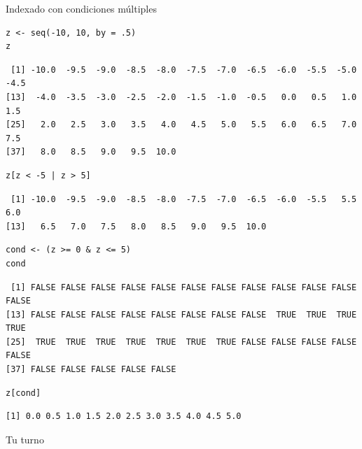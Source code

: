 \documentclass[xcolor={usenames,svgnames,dvipsnames}]{beamer}
\begin{document}
\begin{frame}[fragile,label=sec-3-1-3]{Indexado con condiciones múltiples}
 \lstset{language=R,label= ,caption= ,numbers=none}
\begin{lstlisting}
z <- seq(-10, 10, by = .5)
z
\end{lstlisting}

\begin{verbatim}
 [1] -10.0  -9.5  -9.0  -8.5  -8.0  -7.5  -7.0  -6.5  -6.0  -5.5  -5.0  -4.5
[13]  -4.0  -3.5  -3.0  -2.5  -2.0  -1.5  -1.0  -0.5   0.0   0.5   1.0   1.5
[25]   2.0   2.5   3.0   3.5   4.0   4.5   5.0   5.5   6.0   6.5   7.0   7.5
[37]   8.0   8.5   9.0   9.5  10.0
\end{verbatim}

\lstset{language=R,label= ,caption= ,numbers=none}
\begin{lstlisting}
z[z < -5 | z > 5]
\end{lstlisting}

\begin{verbatim}
 [1] -10.0  -9.5  -9.0  -8.5  -8.0  -7.5  -7.0  -6.5  -6.0  -5.5   5.5   6.0
[13]   6.5   7.0   7.5   8.0   8.5   9.0   9.5  10.0
\end{verbatim}

\lstset{language=R,label= ,caption= ,numbers=none}
\begin{lstlisting}
cond <- (z >= 0 & z <= 5)
cond
\end{lstlisting}

\begin{verbatim}
 [1] FALSE FALSE FALSE FALSE FALSE FALSE FALSE FALSE FALSE FALSE FALSE FALSE
[13] FALSE FALSE FALSE FALSE FALSE FALSE FALSE FALSE  TRUE  TRUE  TRUE  TRUE
[25]  TRUE  TRUE  TRUE  TRUE  TRUE  TRUE  TRUE FALSE FALSE FALSE FALSE FALSE
[37] FALSE FALSE FALSE FALSE FALSE
\end{verbatim}

\lstset{language=R,label= ,caption= ,numbers=none}
\begin{lstlisting}
z[cond]
\end{lstlisting}

\begin{verbatim}
[1] 0.0 0.5 1.0 1.5 2.0 2.5 3.0 3.5 4.0 4.5 5.0
\end{verbatim}
\end{frame}

\begin{frame}[label=sec-3-1-4]{Tu turno}
\end{frame}
\end{document}
